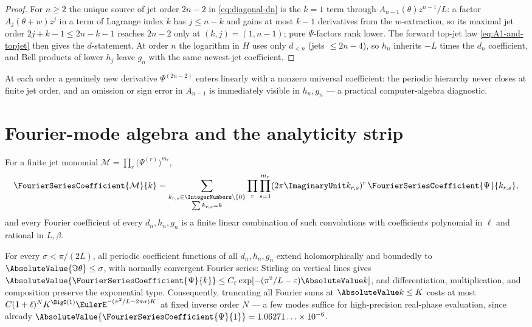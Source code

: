 \documentclass[11pt,oneside]{article}
\numberwithin{equation}{section}
\theoremstyle{definition}
\theoremstyle{remark}
\newcommand{\eps}{\varepsilon}
\begin{document}
\begin{proof}
For $n\ge2$ the unique source of jet order $2n-2$ in
\eqref{eq:diagonal-dn} is the $k=1$ term through
$A_{n-1}(\theta)z^{n-1}/L$: a factor $A_j(\theta+w)z^{j}$ in a term
of Lagrange index $k$ has $j\le n-k$ and gains at most $k-1$
derivatives from the $w$-extraction, so its maximal jet order
$2j+k-1\le2n-k-1$ reaches $2n-2$ only at $(k,j)=(1,n-1)$; pure
$\Psi$-factors rank lower.  The forward top-jet law
\eqref{eq:A1-and-topjet} then gives the $d$-statement.  At order $n$
the logarithm in $H$ uses only $d_{<n}$ (jets $\le2n-4$), so
$h_n$ inherits $-L$ times the $d_n$ coefficient, and Bell products of
lower $h_j$ leave $g_n$ with the same newest-jet coefficient.
\end{proof}

At each order a genuinely new derivative $\Psi^{(2n-2)}$ enters
linearly with a nonzero universal coefficient: the periodic hierarchy
never closes at finite jet order, and an omission or sign error in
$A_{n-1}$ is immediately visible in $h_n,g_n$ --- a practical
computer-algebra diagnostic.

\section{Fourier-mode algebra and the analyticity strip}
\label{sec:fourier}

\begin{proposition}
\label{prop:convolutions}
For a finite jet monomial
$\mathcal M=\prod_{r}\bigl(\Psi^{(r)}\bigr)^{m_r}$,
\begin{equation}
 \FourierSeriesCoefficient{\mathcal M}{k}
 =\sum_{\substack{k_{r,s}\in\IntegerNumbers\setminus\{0\}\\ \sum k_{r,s}=k}}
 \prod_{r}\prod_{s=1}^{m_r}
 (2\pi\ImaginaryUnit k_{r,s})^{r}\,\FourierSeriesCoefficient{\Psi}{k_{r,s}},
 \label{eq:convolution}
\end{equation}
and every Fourier coefficient of every $d_n,h_n,g_n$ is a finite
linear combination of such convolutions with coefficients polynomial
in $\ell$ and rational in $L,\beta$.
\end{proposition}

\begin{proposition}
\label{prop:strip}
For every $\sigma<\pi/(2L)$, all periodic coefficient functions of
all $d_n,h_n,g_n$ extend holomorphically and boundedly to
$\AbsoluteValue{\Im\theta}\le\sigma$, with normally convergent Fourier series:
Stirling on vertical lines gives
$\AbsoluteValue{\FourierSeriesCoefficient{\Psi}{k}}\le C_\eps\exp[-(\pi^{2}/L-\eps)\AbsoluteValue k]$, and
differentiation, multiplication, and composition preserve the
exponential type.  Consequently, truncating all Fourier sums at
$\AbsoluteValue k\le K$ costs at most
$C(1+\ell)^{N}K^{\BigO(1)}
\EulerE^{-(\pi^{2}/L-2\pi\sigma)K}$ at fixed inverse order $N$ --- a few
modes suffice for high-precision real-phase evaluation, since already
$\AbsoluteValue{\FourierSeriesCoefficient{\Psi}{1}}=1.06271\ldots\times10^{-6}$.
\end{proposition}
\end{document}
